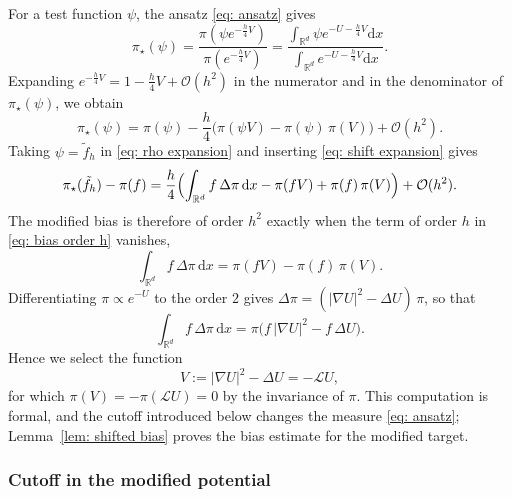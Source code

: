 \documentclass{article}
\newcommand{\D}{\mathrm{d}}
\numberwithin{equation}{section}
\begin{document}
For a test function $\psi$, the ansatz \eqref{eq: ansatz} gives
\begin{equation*}
\pi_\star(\psi) = \frac{\pi( \psi e^{-\frac h4 V} ) }{ \pi( e^{-\frac h4 V})} = \frac{\int_{\mathbb R^d} \psi e^{-U-\frac h4V}\D x}{\int_{\mathbb R^d} e^{-U-\frac h4V}\D x}.
\end{equation*}
Expanding $e^{-\frac h4 V} = 1 - \frac h4 V + \mathcal O(h^2)$ in the numerator and in the denominator of $\pi_\star(\psi)$, we obtain
\begin{equation}
    \pi_\star(\psi) = \pi(\psi) - \frac h4 \bigl( \pi(\psi V) - \pi(\psi)\, \pi(V) \bigr) + \mathcal O(h^2) .
    \label{eq: rho expansion}
\end{equation}
Taking $\psi = \tilde f_h$ in \eqref{eq: rho expansion} and inserting \eqref{eq: shift expansion} gives
\begin{equation}
    \pi_\star(\tilde f_h) - \pi(f) = \frac h4 \Bigl( \int_{\mathbb R^d} f\, \Delta \pi\, \D x - \pi(f V) + \pi(f)\, \pi(V) \Bigr) + \mathcal O( h^2) .
    \label{eq: bias order h}
\end{equation}
The modified bias is therefore of order $h^2$ exactly when the term of order $h$ in \eqref{eq: bias order h} vanishes,
\begin{equation}
    \int_{\mathbb R^d} f\, \Delta \pi\, \D x = \pi(f V) - \pi(f)\, \pi(V) .
    \label{eq: V condition}
\end{equation}
Differentiating $\pi \propto e^{-U}$ to the order $2$ gives $\Delta \pi = ( |\nabla U|^2 - \Delta U )\, \pi$, so that
\begin{equation*}
    \int_{\mathbb R^d} f\, \Delta \pi\, \D x = \pi\bigl( f\, |\nabla U|^2 - f\, \Delta U \bigr) .
\end{equation*}
Hence we select the function
\begin{equation}
    V := |\nabla U|^2 - \Delta U = -\mathcal L U ,
    \label{eq: V}
\end{equation}
for which $\pi(V) = -\pi(\mathcal L U) = 0$ by the invariance of $\pi$.
This computation is formal, and the cutoff introduced below changes the measure \eqref{eq: ansatz}; Lemma~\ref{lem: shifted bias} proves the bias estimate for the modified target.

\subsubsection*{Cutoff in the modified potential}
\end{document}
